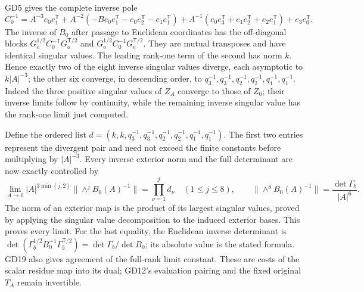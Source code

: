 \documentclass[11pt]{article}
\begin{document}
GD5 gives the complete inverse pole
\begin{equation}
 C_0^{-1}=A^{-3}e_0e_1^{\mathsf T}
 +A^{-2}(-B e_0e_1^{\mathsf T}-e_0e_2^{\mathsf T}-e_1e_1^{\mathsf T})
 +A^{-1}(e_0e_3^{\mathsf T}+e_1e_2^{\mathsf T}+e_2e_1^{\mathsf T})
 +e_3e_0^{\mathsf T}.
 \tag{GD20}
\end{equation}
The inverse of $B_0$ after passage to Euclidean coordinates
has the off-diagonal blocks
$G_e^{1/2}C_0^{-\mathsf T}G_o^{\mathsf T/2}$ and
$G_o^{1/2}C_0^{-1}G_e^{\mathsf T/2}$. They are mutual
transposes and have identical singular values. The
leading rank-one term of the second has norm $k$.
Hence exactly two of the eight inverse singular values
diverge, each asymptotic to $k|A|^{-3}$; the other six
converge, in descending order, to
$q_3^{-1},q_3^{-1},q_2^{-1},q_2^{-1},q_1^{-1},q_1^{-1}$.
Indeed the three positive singular values of $Z_A$
converge to those of $Z_0$; their inverse limits follow
by continuity, while the remaining inverse singular
value has the rank-one limit just computed.

Define the ordered list
$d=(k,k,q_3^{-1},q_3^{-1},q_2^{-1},q_2^{-1},q_1^{-1},q_1^{-1})$.
The first two entries represent the divergent pair and
need not exceed the finite constants before multiplying
by $|A|^{-3}$. Every inverse exterior norm and the
full determinant are now exactly controlled by
\begin{equation}
 \lim_{A\to0}|A|^{3\min(j,2)}\|\wedge^j B_0(A)^{-1}\|
       =\prod_{\nu=1}^j d_\nu\quad(1\le j\le8),\qquad
 \|\wedge^8 B_0(A)^{-1}\|=\frac{\det\Gamma_b}{|A|^6}.
 \tag{GD21}
\end{equation}
The norm of an exterior map is the product of its
largest singular values, proved by applying the singular
value decomposition to the induced exterior bases.
This proves every limit. For the last equality, the
Euclidean inverse determinant is
$\det(\Gamma_b^{1/2}B_0^{-1}\Gamma_b^{\mathsf T/2})
 =\det\Gamma_b/\det B_0$; its absolute value is the
stated formula. GD19 also gives agreement of the
full-rank limit constant. These are costs of the
scalar residue map into its dual; GD12's evaluation
pairing and the fixed original $T_A$ remain invertible.
\end{document}
